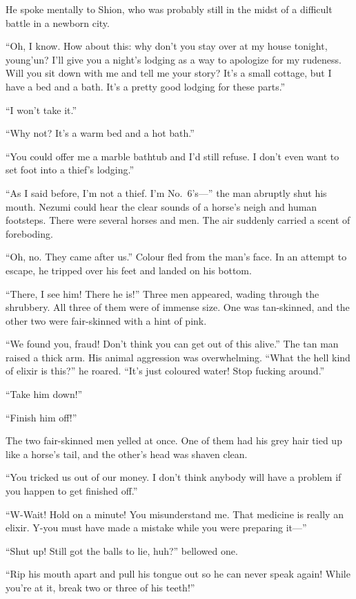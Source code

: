 He spoke mentally to Shion, who was probably still in the midst of a
difficult battle in a newborn city.

``Oh, I know. How about this: why don't you stay over at my house
tonight, young'un? I'll give you a night's lodging as a way to apologize
for my rudeness. Will you sit down with me and tell me your story? It's
a small cottage, but I have a bed and a bath. It's a pretty good lodging
for these parts.''

``I won't take it.''

``Why not? It's a warm bed and a hot bath.''

``You could offer me a marble bathtub and I'd still refuse. I don't even
want to set foot into a thief's lodging.''

``As I said before, I'm not a thief. I'm No.~6's---'' the man abruptly shut
his mouth. Nezumi could hear the clear sounds of a horse's neigh and
human footsteps. There were several horses and men. The air suddenly
carried a scent of foreboding.

``Oh, no. They came after us.'' Colour fled from the man's face. In an
attempt to escape, he tripped over his feet and landed on his bottom.

``There, I see him! There he is!'' Three men appeared, wading through
the shrubbery. All three of them were of immense size. One was
tan-skinned, and the other two were fair-skinned with a hint of pink.

``We found you, fraud! Don't think you can get out of this alive.'' The
tan man raised a thick arm. His animal aggression was overwhelming.
``What the hell kind of elixir is this?'' he roared. ``It's just
coloured water! Stop fucking around.''

``Take him down!''

``Finish him off!''

The two fair-skinned men yelled at once. One of them had his grey hair
tied up like a horse's tail, and the other's head was shaven clean.

``You tricked us out of our money. I don't think anybody will have a
problem if you happen to get finished off.''

``W-Wait! Hold on a minute! You misunderstand me. That medicine is
really an elixir. Y-you must have made a mistake while you were
preparing it---''

``Shut up! Still got the balls to lie, huh?'' bellowed one.

``Rip his mouth apart and pull his tongue out so he can never speak
again! While you're at it, break two or three of his teeth!''

